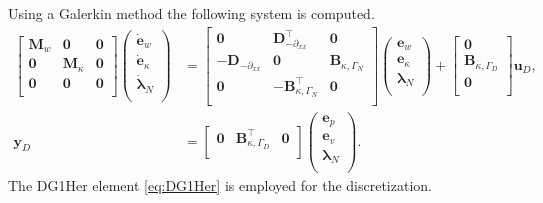 Using a Galerkin method the following system is computed.
\begin{equation}\label{eq:pHfindim_phdae_EB}
\begin{aligned}
\begin{bmatrix}
\mathbf{M}_{w} & \mathbf{0} & \mathbf{0}\\
\mathbf{0} & \mathbf{M}_{\kappa} & \mathbf{0} \\
\mathbf{0} & \mathbf{0} & \mathbf{0} \\
\end{bmatrix}
\begin{pmatrix}
\dot{\mathbf{e}}_w\\
\dot{\mathbf{e}}_\kappa\\
\dot{\bm{\lambda}}_N \\
\end{pmatrix}
&= \begin{bmatrix}
\mathbf{0} & \mathbf{D}_{-\partial_{xx}}^\top & \mathbf{0} \\
-\mathbf{D}_{-\partial_{xx}} & \mathbf{0} & \mathbf{B}_{\kappa, \Gamma_N}  \\
\mathbf{0} & -\mathbf{B}_{\kappa, \Gamma_N}^\top & \mathbf{0} \\
\end{bmatrix}
\begin{pmatrix}
{\mathbf{e}}_w\\
{\mathbf{e}}_\kappa\\
{\bm{\lambda}}_N \\
\end{pmatrix} + \begin{bmatrix}
\mathbf{0} \\
\mathbf{B}_{\kappa, \Gamma_D} \\
\mathbf{0} \\
\end{bmatrix} \mathbf{u}_D, \\
\mathbf{y}_D  &=
\begin{bmatrix}
\mathbf{0} & \mathbf{B}_{\kappa, \Gamma_D}^\top & \mathbf{0}\\ 
\end{bmatrix}
\begin{pmatrix}
{\mathbf{e}}_p\\
{\mathbf{e}}_v\\
{\bm{\lambda}}_N \\
\end{pmatrix}.
\end{aligned}
\end{equation}
The DG1Her element \eqref{eq:DG1Her} is employed for the discretization.

